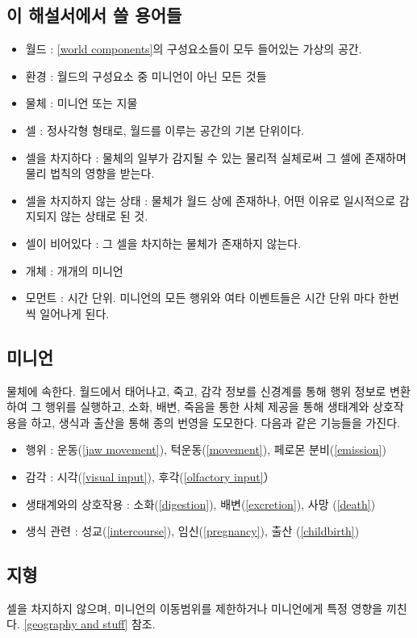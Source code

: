 \documentclass[a4paper,12pt]{article}
\begin{document}
\subsection{이 해설서에서 쓸 용어들}\label{basic terms}
\begin{itemize}
\item 월드 : \ref{world components}의 구성요소들이 모두 들어있는 가상의 공간. 
\item 환경 : 월드의 구성요소 중 미니언이 아닌 모든 것들
\item 물체 : 미니언 또는 지물
\item 셀 : 정사각형 형태로, 월드를 이루는 공간의 기본 단위이다. 
\item 셀을 차지하다 : 물체의 일부가 감지될 수 있는 물리적 실체로써 그 셀에 존재하며 물리 법칙의 영향을 받는다. 
\item 셀을 차지하지 않는 상태 : 물체가 월드 상에 존재하나, 어떤 이유로 일시적으로 감지되지 않는 상태로 된 것.
\item 셀이 비어있다 : 그 셀을 차지하는 물체가 존재하지 않는다.  
\item 개체 : 개개의 미니언 
\item 모먼트 : 시간 단위. 미니언의 모든 행위와 여타 이벤트들은 시간 단위 마다 한번 씩 일어나게 된다.  
\end{itemize}

\subsection{미니언}\label{minion}
물체에 속한다. 
월드에서 태어나고, 죽고, 
감각 정보를 신경계를 통해 행위 정보로 변환하여 그 행위를 실행하고, 
소화, 배변, 죽음을 통한 사체 제공을 통해 생태계와 상호작용을 하고,
생식과 출산을 통해 종의 번영을 도모한다. 다음과 같은 기능들을 가진다. 
\begin{itemize}
\item 행위 : 
운동(\ref{jaw movement}), 턱운동(\ref{movement}), 페로몬 분비(\ref{emission})
\item 감각 :  
시각(\ref{visual input}), 후각(\ref{olfactory input}）
\item 생태계와의 상호작용 :  
소화(\ref{digestion}), 배변(\ref{excretion}), 사망 (\ref{death})
\item 생식 관련 :  
성교(\ref{intercourse}), 임신(\ref{pregnancy}), 출산 (\ref{childbirth})
\end{itemize}

\subsection{지형}\label{geography}
셀을 차지하지 않으며, 미니언의 이동범위를 제한하거나 미니언에게 특정 영향을 끼친다. 
\ref{geography and stuff} 참조. 
\end{document}
